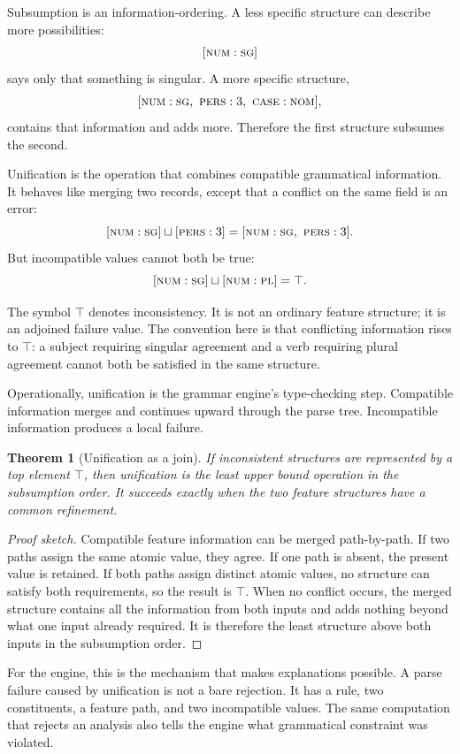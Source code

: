 \documentclass[11pt]{article}
\theoremstyle{definition}
\theoremstyle{plain}
\newtheorem{theorem}{Theorem}[section]
\theoremstyle{remark}
\begin{document}
Subsumption is an information-ordering. A less specific structure can describe
more possibilities:
\[
  [\textsc{num}:\textsc{sg}]
\]
says only that something is singular. A more specific structure,
\[
  [\textsc{num}:\textsc{sg},\ \textsc{pers}:3,\ \textsc{case}:\textsc{nom}],
\]
contains that information and adds more. Therefore the first structure subsumes
the second.

Unification is the operation that combines compatible grammatical information.
It behaves like merging two records, except that a conflict on the same field is
an error:
\[
  [\textsc{num}:\textsc{sg}] \sqcup [\textsc{pers}:3]
  =
  [\textsc{num}:\textsc{sg},\ \textsc{pers}:3].
\]
But incompatible values cannot both be true:
\[
  [\textsc{num}:\textsc{sg}] \sqcup [\textsc{num}:\textsc{pl}] = \top.
\]

The symbol $\top$ denotes inconsistency. It is not an ordinary feature structure;
it is an adjoined failure value. The convention here is that conflicting
information rises to $\top$: a subject requiring singular agreement and a verb
requiring plural agreement cannot both be satisfied in the same structure.

Operationally, unification is the grammar engine's type-checking step.
Compatible information merges and continues upward through the parse tree.
Incompatible information produces a local failure.

\begin{theorem}[Unification as a join]
If inconsistent structures are represented by a top element $\top$, then
unification is the least upper bound operation in the subsumption order. It
succeeds exactly when the two feature structures have a common refinement.
\end{theorem}

\begin{proof}[Proof sketch]
Compatible feature information can be merged path-by-path. If two paths assign
the same atomic value, they agree. If one path is absent, the present value is
retained. If both paths assign distinct atomic values, no structure can satisfy
both requirements, so the result is $\top$. When no conflict occurs, the merged
structure contains all the information from both inputs and adds nothing beyond
what one input already required. It is therefore the least structure above both
inputs in the subsumption order.
\end{proof}

For the engine, this is the mechanism that makes explanations possible. A parse
failure caused by unification is not a bare rejection. It has a rule, two
constituents, a feature path, and two incompatible values. The same computation
that rejects an analysis also tells the engine what grammatical constraint was
violated.
\end{document}
